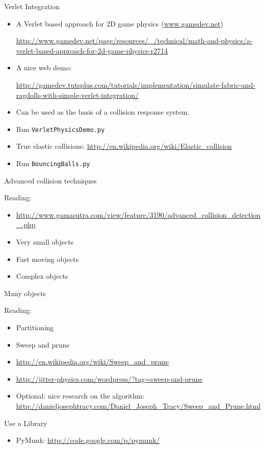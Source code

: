 \documentclass[handout,t,compress]{beamer}
\newcommand{\bframe}[1]{\begin{frame}[fragile]{#1}}
\begin{document}
\bframe{Verlet Integration}

\begin{itemize}
\item A Verlet based approach for 2D game physics (\url{www.gamedev.net})

{\tiny\url{http://www.gamedev.net/page/resources/_/technical/math-and-physics/a-verlet-based-approach-for-2d-game-physics-r2714}}
\item A nice web demo:

{\tiny\url{http://gamedev.tutsplus.com/tutorials/implementation/simulate-fabric-and-ragdolls-with-simple-verlet-integration/}}
\item Can be used as the basis of a collision response system.
\item Run {\tt VerletPhysicsDemo.py}
\item True elastic collisions:
\url{http://en.wikipedia.org/wiki/Elastic_collision}
\item Run {\tt BouncingBalls.py}
\end{itemize}

\end{frame}


\bframe{Advanced collision techniques}

Reading:
\begin{itemize}
\item {\tiny
\url{http://www.gamasutra.com/view/feature/3190/advanced_collision_detection_.php}
}
\item Very small objects
\item Fast moving objects
\item Complex objects
\end{itemize}

\end{frame}

\bframe{Many objects}

Reading:
\begin{itemize}
\item Partitioning
\item Sweep and prune
\item \url{http://en.wikipedia.org/wiki/Sweep_and_prune}
\item \url{http://jitter-physics.com/wordpress/?tag=sweep-and-prune}
\item Optional:  nice research on the algorithm:
\url {http://danieljosephtracy.com/Daniel_Joseph_Tracy/Sweep_and_Prune.html}
\end{itemize}

\end{frame}

\bframe{Use a Library}
\begin{itemize}
\item PyMunk: \url{http://code.google.com/p/pymunk/}
\end{itemize}
\end{frame}
\end{document}
